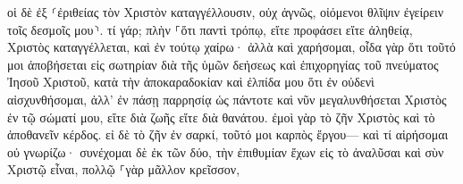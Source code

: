 \documentclass{openreader}
\begin{document}
οἱ δὲ ἐξ ⸂ἐριθείας τὸν Χριστὸν καταγγέλλουσιν, οὐχ ἁγνῶς, οἰόμενοι θλῖψιν ἐγείρειν τοῖς δεσμοῖς μου⸃. 
τί γάρ; πλὴν ⸀ὅτι παντὶ τρόπῳ, εἴτε προφάσει εἴτε ἀληθείᾳ, Χριστὸς καταγγέλλεται, καὶ ἐν τούτῳ χαίρω· ἀλλὰ καὶ χαρήσομαι, 
οἶδα γὰρ ὅτι τοῦτό μοι ἀποβήσεται εἰς σωτηρίαν διὰ τῆς ὑμῶν δεήσεως καὶ ἐπιχορηγίας τοῦ πνεύματος Ἰησοῦ Χριστοῦ, 
κατὰ τὴν ἀποκαραδοκίαν καὶ ἐλπίδα μου ὅτι ἐν οὐδενὶ αἰσχυνθήσομαι, ἀλλ’ ἐν πάσῃ παρρησίᾳ ὡς πάντοτε καὶ νῦν μεγαλυνθήσεται Χριστὸς ἐν τῷ σώματί μου, εἴτε διὰ ζωῆς εἴτε διὰ θανάτου. 
ἐμοὶ γὰρ τὸ ζῆν Χριστὸς καὶ τὸ ἀποθανεῖν κέρδος. 
εἰ δὲ τὸ ζῆν ἐν σαρκί, τοῦτό μοι καρπὸς ἔργου— καὶ τί αἱρήσομαι οὐ γνωρίζω· 
συνέχομαι δὲ ἐκ τῶν δύο, τὴν ἐπιθυμίαν ἔχων εἰς τὸ ἀναλῦσαι καὶ σὺν Χριστῷ εἶναι, πολλῷ ⸀γὰρ μᾶλλον κρεῖσσον, 
\end{document}

